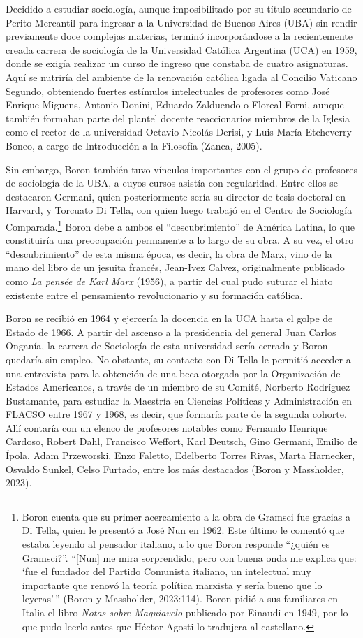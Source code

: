 Decidido a estudiar sociología, aunque imposibilitado por su título secundario de Perito Mercantil para ingresar a la Universidad de Buenos Aires (UBA) sin rendir previamente doce complejas materias, terminó incorporándose a la recientemente creada carrera de sociología de la Universidad Católica Argentina (UCA) en 1959, donde se exigía realizar un curso de ingreso que constaba de cuatro asignaturas. Aquí se nutriría del ambiente de la renovación católica ligada al Concilio Vaticano Segundo, obteniendo fuertes estímulos intelectuales de profesores como José Enrique Miguens, Antonio Donini, Eduardo Zalduendo o Floreal Forni, aunque también formaban parte del plantel docente reaccionarios miembros de la Iglesia como el rector de la universidad Octavio Nicolás Derisi, y Luis María Etcheverry Boneo, a cargo de Introducción a la Filosofía (Zanca, 2005).

Sin embargo, Boron también tuvo vínculos importantes con el grupo de profesores de sociología de la UBA, a cuyos cursos asistía con regularidad. Entre ellos se destacaron Germani, quien posteriormente sería su director de tesis doctoral en Harvard, y Torcuato Di Tella, con quien luego trabajó en el Centro de Sociología Comparada.\footnote{Boron cuenta que su primer acercamiento a la obra de Gramsci fue gracias a Di Tella, quien le presentó a José Nun en 1962. Este último le comentó que estaba leyendo al pensador italiano, a lo que Boron responde ``¿quién es Gramsci?''. ``{[}Nun{]} me mira sorprendido, pero con buena onda me explica que: `fue el fundador del Partido Comunista italiano, un intelectual muy importante que renovó la teoría política marxista y sería bueno que lo leyeras'\,'' (Boron y Massholder, 2023:114). Boron pidió a sus familiares en Italia el libro \emph{Notas sobre Maquiavelo} publicado por Einaudi en 1949, por lo que pudo leerlo antes que Héctor Agosti lo tradujera al castellano.} Boron debe a ambos el ``descubrimiento'' de América Latina, lo que constituiría una preocupación permanente a lo largo de su obra. A su vez, el otro ``descubrimiento'' de esta misma época, es decir, la obra de Marx, vino de la mano del libro de un jesuita francés, Jean-Ivez Calvez, originalmente publicado como \emph{La pensée de Karl Marx} (1956), a partir del cual pudo suturar el hiato existente entre el pensamiento revolucionario y su formación católica.

Boron se recibió en 1964 y ejercería la docencia en la UCA hasta el golpe de Estado de 1966. A partir del ascenso a la presidencia del general Juan Carlos Onganía, la carrera de Sociología de esta universidad sería cerrada y Boron quedaría sin empleo. No obstante, su contacto con Di Tella le permitió acceder a una entrevista para la obtención de una beca otorgada por la Organización de Estados Americanos, a través de un miembro de su Comité, Norberto Rodríguez Bustamante, para estudiar la Maestría en Ciencias Políticas y Administración en FLACSO entre 1967 y 1968, es decir, que formaría parte de la segunda cohorte. Allí contaría con un elenco de profesores notables como Fernando Henrique Cardoso, Robert Dahl, Francisco Weffort, Karl Deutsch, Gino Germani, Emilio de Ípola, Adam Przeworski, Enzo Faletto, Edelberto Torres Rivas, Marta Harnecker, Osvaldo Sunkel, Celso Furtado, entre los más destacados (Boron y Massholder, 2023).

